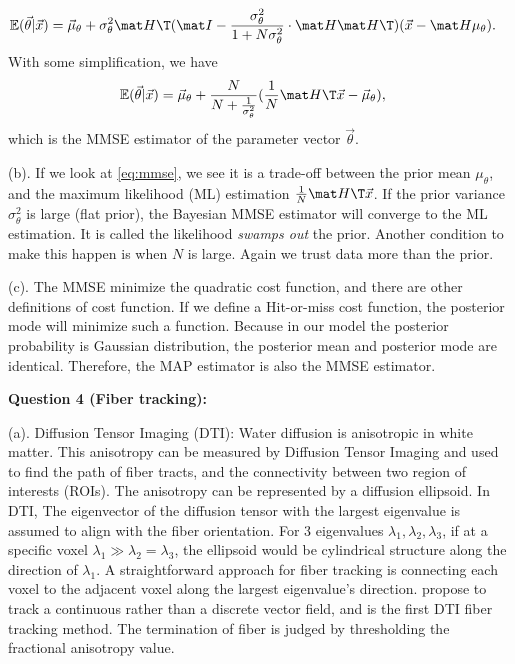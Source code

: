 \documentclass[12pt]{article}
\begin{document}
\begin{align*}
  \mathbb{E}(\vec \theta | \vec x) &= \vec \mu_\theta + \sigma_\theta^2 \mat H\T(\mat I - \frac{\sigma_\theta^2}{1+N\sigma_\theta^2}\cdot \mat H \mat H\T) ( \vec x - \mat H\mu_\theta).
\end{align*}
With some simplification, we have
\begin{align}
 \mathbb{E}(\vec \theta | \vec x) &= \vec \mu_\theta + \frac{N}{N + \frac{1}{\sigma_\theta^2}}(\frac{1}{N}\mat H\T \vec x - \vec \mu_\theta), \label{eq:mmse}
\end{align}
which is the MMSE estimator of the parameter vector $\vec \theta$.

(b). If we look at \eqref{eq:mmse}, we see it is a trade-off between the prior
mean $\mu_\theta$, and the maximum likelihood (ML) estimation $\frac{1}{N}\mat
H\T \vec x$.  If the prior variance $\sigma_\theta^2$ is large (flat prior), the
Bayesian MMSE estimator will converge to the ML estimation. It is called the
likelihood \emph{swamps out} the prior. Another condition to make this happen is
when $N$ is large. Again we trust data more than the prior.

(c). The MMSE minimize the quadratic cost function, and there are other
definitions of cost function. If we define a Hit-or-miss cost function, the
posterior mode will minimize such a function. Because in our model the posterior
probability is Gaussian distribution, the posterior mean and posterior mode are
identical. Therefore, the MAP estimator is also the MMSE estimator.


\newpage
\textbf{Question  4 (Fiber tracking):}

(a). Diffusion Tensor Imaging (DTI): Water diffusion is anisotropic in white
matter. This anisotropy can be measured by Diffusion Tensor Imaging and used to
find the path of fiber tracts, and the connectivity between two region of
interests (ROIs).  The anisotropy can be represented by a diffusion
ellipsoid. In DTI, The eigenvector of the diffusion tensor with the largest
eigenvalue is assumed to align with the fiber orientation. For 3 eigenvalues
$\lambda_1, \lambda_2, \lambda_3$, if at a specific voxel $\lambda_1 \gg
\lambda_2 = \lambda_3$, the ellipsoid would be cylindrical structure along the
direction of $\lambda_1$. A straightforward approach for fiber tracking is
connecting each voxel to the adjacent voxel along the largest eigenvalue's
direction. \citet{mori1999three} propose to track a continuous rather than a
discrete vector field, and is the first DTI fiber tracking method. The
termination of fiber is judged by thresholding the fractional anisotropy value.
\end{document}
